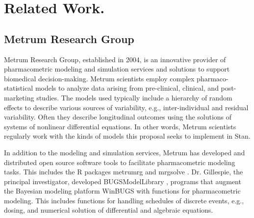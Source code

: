 \section{Related Work.}


\subsection{Metrum Research Group}

Metrum Research Group, established in 2004, is an innovative provider
of pharmacometric modeling and simulation services and solutions to
support biomedical decision-making. Metrum scientists employ complex
pharmaco-statistical models to analyze data arising from pre-clinical,
clinical, and post-marketing studies. The models used typically
include a hierarchy of random effects to describe various sources of
variability, e.g., inter-individual and residual variability. Often
they describe longitudinal outcomes using the solutions of systems of
nonlinear differential equations. In other words, Metrum scientists
regularly work with the kinds of models this proposal seeks to
implement in Stan.

In addition to the modeling and simulation services, Metrum has
developed and distributed open source software tools to facilitate
pharmacometric modeling tasks. This includes the R packages metrumrg
\citep{bergsma-et-al:2013} and mrgsolve
\citep{baron-gastonguay:2015}. Dr. Gillespie, the principal
investigator, developed BUGSModelLibrary
\citep{gillespie-gastonguay:2009}, programs that augment the Bayesian
modeling platform WinBUGS \citep{lunn-et-al:2000} with functions for
pharmacometric modeling. This includes functions for handling
schedules of discrete events, e.g., dosing, and numerical solution of
differential and algebraic equations.

